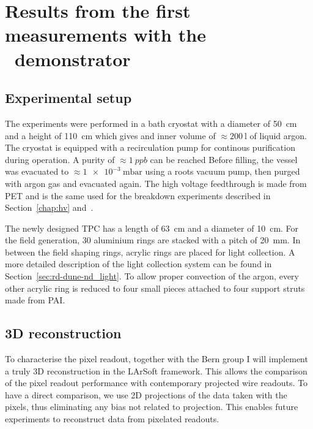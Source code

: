 \chapter{Results from the first measurements with the \AC\ demonstrator\label{chap:viper}}


\section{Experimental setup\label{sec:viper_setup}}
The experiments were performed in a bath cryostat with a diameter of \SI{50}{\centi\metre} and a height of \SI{110}{\centi\metre} which gives and inner volume of $\approx \SI{200}{\litre}$ of liquid argon.
The cryostat is equipped with a recirculation pump for continous purification during operation.
A purity of $\approx \SI{1}{ppb}$ can be reached
Before filling, the vessel was evacuated to $\approx \SI{1e-3}{\milli\bar}$ using a roots vacuum pump, then purged with argon gas and evacuated again.
The high voltage feedthrough is made from PET and is the same used for the breakdown experiments described in Section~\ref{chap:hv} and~\cite{breakdown_14, breakdown_16}.

The newly designed TPC has a length of \SI{63}{\centi\metre} and a diameter of \SI{10}{\centi\metre}. %
For the field generation, \num{30} aluminium rings are stacked with a pitch of \SI{20}{\milli\metre}.
In between the field shaping rings, acrylic rings are placed for light collection.
A more detailed description of the light collection system can be found in Section~\ref{sec:rd-dune-nd_light}.
To allow proper convection of the argon, every other acrylic ring is reduced to four small pieces attached to four support struts made from PAI.


\section{3D reconstruction\label{sec:viper_reco}}
To characterise the pixel readout, together with the Bern group I will implement a truly 3D reconstruction in the LArSoft framework.
This allows the comparison of the pixel readout performance with contemporary projected wire readouts.
To have a direct comparison, we use 2D projections of the data taken with the pixels, thus eliminating any bias not related to projection.
This enables future experiments to reconstruct data from pixelated readouts.